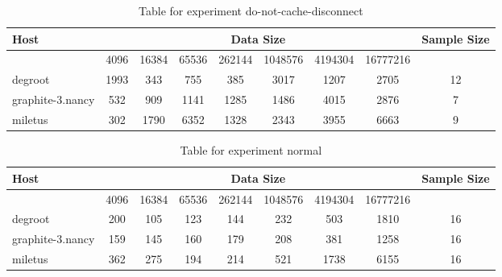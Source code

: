 \begin{table}
\caption{Table for experiment do-not-cache-disconnect}
\begin{tabular}{@{}lcccccccc@{}}
\toprule
Host    & \multicolumn{7}{c}{Data Size}          & Sample Size \\ \midrule
& 4096  & 16384  & 65536  & 262144  & 1048576  & 4194304  & 16777216              \\ \midrule
degroot  & 1993  & 343  & 755  & 385  & 3017  & 1207  & 2705  & 12 \\
graphite-3.nancy  & 532  & 909  & 1141  & 1285  & 1486  & 4015  & 2876  & 7 \\
miletus  & 302  & 1790  & 6352  & 1328  & 2343  & 3955  & 6663  & 9 \\
\bottomrule
\end{tabular}
\end{table}

\begin{table}
\caption{Table for experiment normal}
\begin{tabular}{@{}lcccccccc@{}}
\toprule
Host    & \multicolumn{7}{c}{Data Size}          & Sample Size \\ \midrule
& 4096  & 16384  & 65536  & 262144  & 1048576  & 4194304  & 16777216              \\ \midrule
degroot  & 200  & 105  & 123  & 144  & 232  & 503  & 1810  & 16 \\
graphite-3.nancy  & 159  & 145  & 160  & 179  & 208  & 381  & 1258  & 16 \\
miletus  & 362  & 275  & 194  & 214  & 521  & 1738  & 6155  & 16 \\
\bottomrule
\end{tabular}
\end{table}



